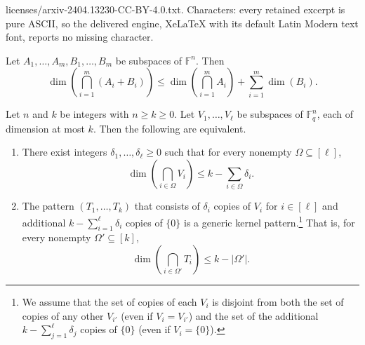\documentclass[10pt,a4paper]{amsart}
\newcommand{\F}{\mathbb{F}}
\begin{document}
licenses/arxiv-2404.13230-CC-BY-4.0.txt. Characters: every retained excerpt is pure ASCII, so the delivered engine, XeLaTeX with its default Latin Modern text font, reports no missing character.
\begin{lemma}\label{lm:dim}
Let $A_1,\ldots,A_m,B_1,\ldots,B_m$ be subspaces of $\F^n$. Then 
\[
\dim\left(\bigcap_{i=1}^m (A_i+B_i)\right)\leq \dim\left(\bigcap_{i=1}^m A_i\right)+\sum_{i=1}^m \dim(B_i).
\]
\end{lemma}

\begin{prop}\label{prop:equivalent}
Let $n$ and $k$ be integers with $n\geq k\geq 0$. Let $V_1,\ldots,V_\ell$ be subspaces of $\F_q^n$, each of dimension at most $k$. Then the following are equivalent. 
\begin{enumerate}
\item\label{it1} There exist integers $\delta_1,\ldots,\delta_\ell\geq 0$ such that for every nonempty $\Omega \subseteq [\ell]$, 
\begin{equation}\label{eqn:copypattern}
\dim\left(\bigcap_{i\in \Omega} V_i\right)\leq k-\sum_{i\in \Omega}\delta_i.
\end{equation}
\item\label{it2} The pattern $(T_1,\ldots,T_k)$ that consists of $\delta_i$ copies of $V_i$ for $i\in [\ell]$ and additional $k-\sum_{i=1}^\ell \delta_i$ copies of $\{0\}$ is a generic kernel pattern.\footnote{We assume that the set of copies of each $V_i$ is disjoint from both the set of copies of any other $V_{i'}$ (even if $V_i = V_{i'}$) and the set of the additional $k - \sum_{j=1}^{\ell} \delta_{j}$ copies of $\{0\}$ (even if $V_i = \{0\}$).} That is, for every nonempty $\Omega'\subseteq [k]$, 
\begin{equation}\label{eqn:pattern}
\dim\left(\bigcap_{i\in \Omega'} T_i\right)\leq k-|\Omega'|.
\end{equation}
\end{enumerate}
\end{prop}
\end{document}
